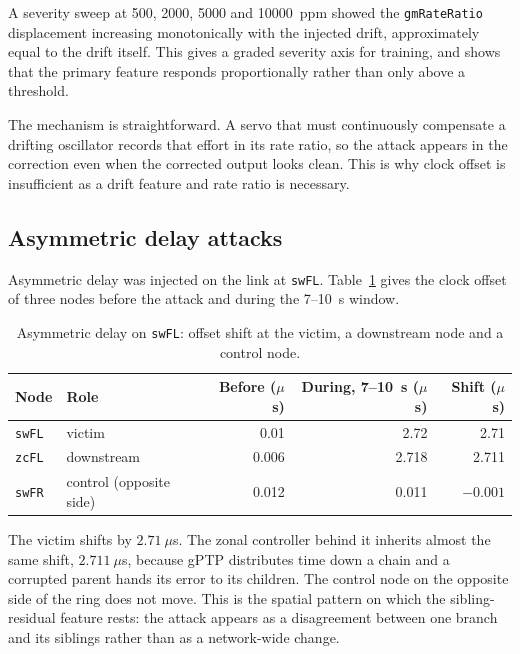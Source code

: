 A severity sweep at 500, 2000, 5000 and 10000~ppm showed the \texttt{gmRateRatio}
displacement increasing monotonically with the injected drift, approximately equal to
the drift itself. This gives a graded severity axis for training, and shows that the
primary feature responds proportionally rather than only above a threshold.

The mechanism is straightforward. A servo that must continuously compensate a drifting
oscillator records that effort in its rate ratio, so the attack appears in the
correction even when the corrected output looks clean. This is why clock offset is
insufficient as a drift feature and rate ratio is necessary.

\subsection{Asymmetric delay attacks}
\label{sec:ring-asym}

Asymmetric delay was injected on the link at \texttt{swFL}. %
Table~\ref{tab:ring-asym} gives the clock offset of three nodes before the attack and
during the 7--10~s window.

\begin{table}[htbp]
\centering
\caption{Asymmetric delay on \texttt{swFL}: offset shift at the victim, a downstream node and a control node.}
\label{tab:ring-asym}
\vspace{0.8em}
\small\setlength{\tabcolsep}{4pt}
\begin{tabular}{l l r r r}
\toprule
\textbf{Node} & \textbf{Role} & \textbf{Before ($\mu$s)} & \textbf{During, 7--10~s ($\mu$s)} & \textbf{Shift ($\mu$s)} \\
\midrule
\texttt{swFL} & victim & 0.01 & 2.72 & 2.71 \\
\texttt{zcFL} & downstream & 0.006 & 2.718 & 2.711 \\
\texttt{swFR} & control (opposite side) & 0.012 & 0.011 & $-0.001$ \\
\bottomrule
\end{tabular}
\end{table}

The victim shifts by $2.71~\mu$s. The zonal controller behind it inherits almost the same
shift, $2.711~\mu$s, because gPTP distributes time down a chain and a corrupted parent
hands its error to its children. The control node on the opposite side of the ring does
not move. This is the spatial pattern on which the sibling-residual feature rests: the
attack appears as a disagreement between one branch and its siblings rather than as a
network-wide change.

